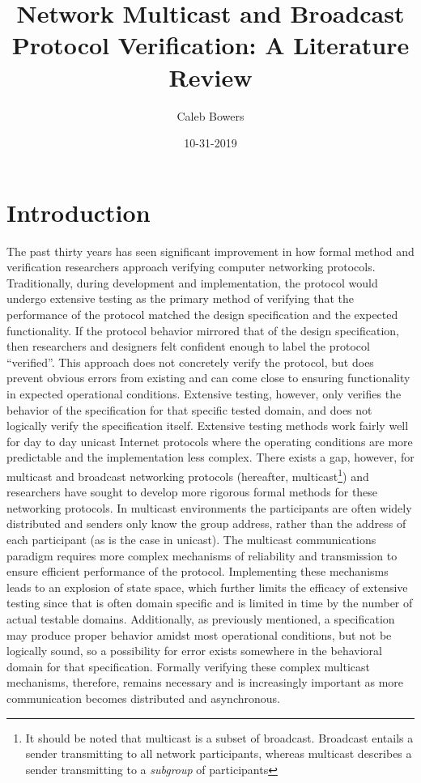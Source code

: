 \documentclass[12pt, fullpage]{article}
\title{Network Multicast and Broadcast Protocol Verification: A Literature Review}
\author{Caleb Bowers}
\date{10-31-2019}
\begin{document}
\begin{titlingpage}
\maketitle
\end{titlingpage}

\tableofcontents

\section{Introduction}
The past thirty years has seen significant improvement in how formal method and verification researchers approach verifying computer networking protocols. Traditionally, during development and implementation, the protocol would undergo extensive testing as the primary method of verifying that the performance of the protocol matched the design specification and the expected functionality. If the protocol behavior mirrored that of the design specification, then researchers and designers felt confident enough to label the protocol ``verified''. This approach does not concretely verify the protocol, but does prevent obvious errors from existing and can come close to ensuring functionality in expected operational conditions. Extensive testing, however, only verifies the behavior of the specification for that specific tested domain, and does not logically verify the specification itself.
\bigbreak
Extensive testing methods work fairly well for day to day unicast Internet protocols where the operating conditions are more predictable and the implementation less complex. There exists a gap, however, for multicast and broadcast networking protocols (hereafter, multicast\footnote{It should be noted that multicast is a subset of broadcast. Broadcast entails a sender transmitting to all network participants, whereas multicast describes a sender transmitting to a \textit{subgroup} of participants}) and researchers have sought to develop more rigorous formal methods for these networking protocols. In multicast environments the participants are often widely distributed and senders only know the group address, rather than the address of each participant (as is the case in unicast). The multicast communications paradigm requires more complex mechanisms of reliability and transmission to ensure efficient performance of the protocol. Implementing these mechanisms leads to an explosion of state space, which further limits the efficacy of extensive testing since that is often domain specific and is limited in time by the number of actual testable domains. Additionally, as previously mentioned, a specification may produce proper behavior amidst most operational conditions, but not be logically sound, so a possibility for error exists somewhere in the behavioral domain for that specification. Formally verifying these complex multicast mechanisms, therefore, remains necessary and is increasingly important as more communication becomes distributed and asynchronous.
\end{document}
